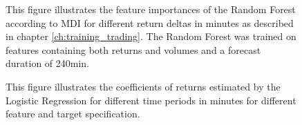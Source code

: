 \begin{figure}[H]
    \captionsetup{format=plain}
    \caption{ 
            This figure illustrates the feature importances of the Random Forest according to MDI \cite{louppe2015variableImportance}
            for different return deltas in minutes as described in chapter \ref{ch:training_trading}. 
            The Random Forest was trained on features containing both returns and volumes and a forecast duration of 240min.
        }
    \label{fig:forest_return_feature_importance_with_volume_240min}
\end{figure}

\begin{figure}[H]
    \captionsetup{format=plain}
    \caption{ 
            This figure illustrates the coefficients of returns estimated by the Logistic Regression
            for different time periods in minutes for different feature and target specification.
        }
    \label{fig:logistic_return_coefficients}
\end{figure}
